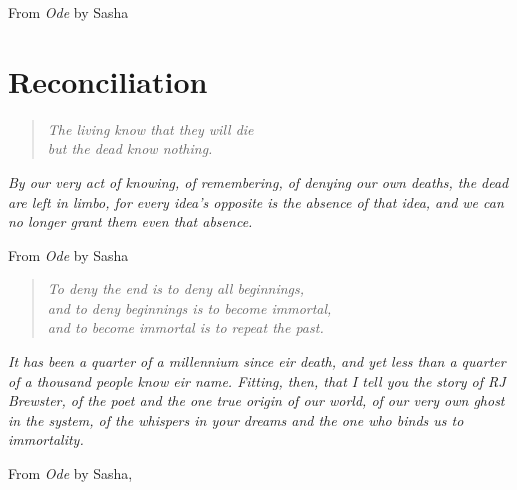 \documentclass[11pt]{memoir}
\begin{document}
  \vspace{1em}

  From \emph{Ode} by Sasha
  \vfill

  
  
  
  
  
  
  
  
  
  
  

  \part{Reconciliation}
  \begin{quote}\itshape
    The living know that they will die \\
    but the dead know nothing.
  \end{quote}

  \noindent\emph{By our very act of knowing, of remembering, of denying our own deaths, the dead are left in limbo, for every idea's opposite is the absence of that idea, and we can no longer grant them even that absence.}

  \vspace{1em}

  From \emph{Ode} by Sasha

  \vfill

  
  
  
  
  
  
  
  
  

  \cleardoublepage
  \thispagestyle{empty}
  \null
  \vfill
  \begin{quote}\itshape
    To deny the end is to deny all beginnings, \\
    and to deny beginnings is to become immortal, \\
    and to become immortal is to repeat the past.
  \end{quote}

  \noindent\emph{It has been a quarter of a millennium since eir death, and yet less than a quarter of a thousand people know eir name. Fitting, then, that I tell you the story of RJ Brewster, of the poet and the one true origin of our world, of our very own ghost in the system, of the whispers in your dreams and the one who binds us to immortality.}

  \vspace{1em}

  From \emph{Ode} by Sasha,
\end{document}
